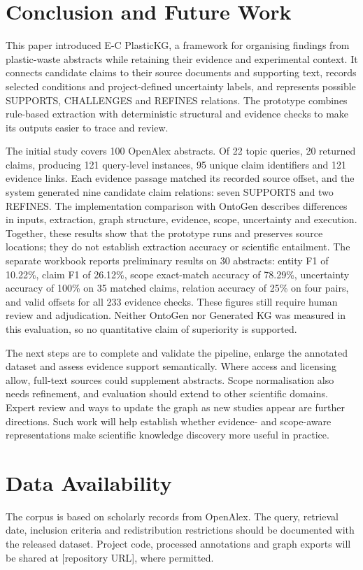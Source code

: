 \documentclass[11pt,a4paper]{article}
\begin{document}
\section{Conclusion and Future Work}

This paper introduced E-C PlasticKG, a framework for organising findings from plastic-waste abstracts while retaining their evidence and experimental context. It connects candidate claims to their source documents and supporting text, records selected conditions and project-defined uncertainty labels, and represents possible SUPPORTS, CHALLENGES and REFINES relations. The prototype combines rule-based extraction with deterministic structural and evidence checks to make its outputs easier to trace and review.

The initial study covers 100 OpenAlex abstracts. Of 22 topic queries, 20 returned claims, producing 121 query-level instances, 95 unique claim identifiers and 121 evidence links. Each evidence passage matched its recorded source offset, and the system generated nine candidate claim relations: seven SUPPORTS and two REFINES. The implementation comparison with OntoGen describes differences in inputs, extraction, graph structure, evidence, scope, uncertainty and execution. Together, these results show that the prototype runs and preserves source locations; they do not establish extraction accuracy or scientific entailment. The separate workbook reports preliminary results on 30 abstracts: entity F1 of 10.22\%, claim F1 of 26.12\%, scope exact-match accuracy of 78.29\%, uncertainty accuracy of 100\% on 35 matched claims, relation accuracy of 25\% on four pairs, and valid offsets for all 233 evidence checks. These figures still require human review and adjudication. Neither OntoGen nor Generated KG was measured in this evaluation, so no quantitative claim of superiority is supported.

The next steps are to complete and validate the pipeline, enlarge the annotated dataset and assess evidence support semantically. Where access and licensing allow, full-text sources could supplement abstracts. Scope normalisation also needs refinement, and evaluation should extend to other scientific domains. Expert review and ways to update the graph as new studies appear are further directions. Such work will help establish whether evidence- and scope-aware representations make scientific knowledge discovery more useful in practice.

\section*{Data Availability}
The corpus is based on scholarly records from OpenAlex. The query, retrieval date, inclusion criteria and redistribution restrictions should be documented with the released dataset. Project code, processed annotations and graph exports will be shared at [repository URL], where permitted.
\end{document}
